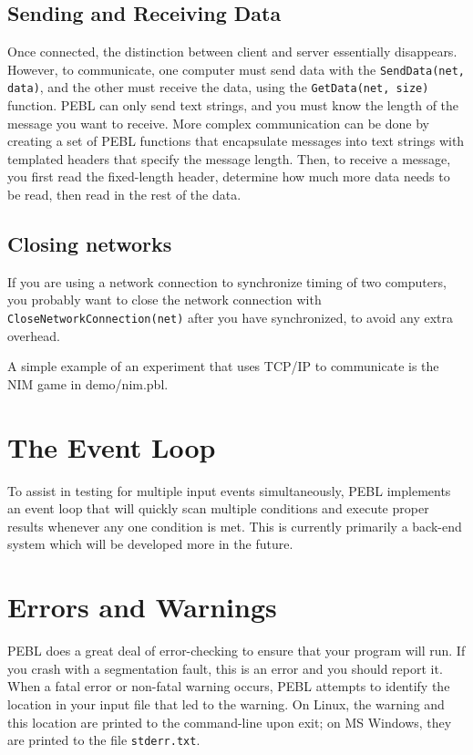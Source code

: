 \subsection{Sending and Receiving Data}
Once connected, the distinction between client and server essentially
disappears.  However, to communicate, one computer must send data with
the \texttt{SendData(net, data)}, and the other must receive the
data, using the \texttt{GetData(net, size)} function.  PEBL can
only send text strings, and you must know the length of the message
you want to receive.  More complex communication can be done by
creating a set of PEBL functions that encapsulate messages into text
strings with templated headers that specify the message length.  Then,
to receive a message, you first read the fixed-length header,
determine how much more data needs to be read, then read in the rest
of the data. 


\subsection{Closing networks}
If you are using a network connection to synchronize timing of two
computers, you probably want to close the network connection with
\texttt{CloseNetworkConnection(net)} after you have synchronized, to
avoid any extra overhead.

A simple example of an experiment that uses TCP/IP to communicate is
the NIM game in  demo/nim.pbl.

\section{The Event Loop}

To assist in testing for multiple input events simultaneously, 
PEBL implements an event loop that will quickly scan multiple conditions
and execute proper results whenever any one condition is met.  
This is currently primarily a back-end system 
which will be developed more in the future.


\section{Errors and Warnings}

PEBL does a great deal of error-checking to ensure that your program
will run.  If you crash with a segmentation fault, this is an error
and you should report it.  When a fatal error or non-fatal warning
occurs, PEBL attempts to identify the location in your input file that
led to the warning.  On Linux, the warning and this location are
printed to the command-line upon exit; on MS Windows, they are printed
to the file \texttt{stderr.txt}.


